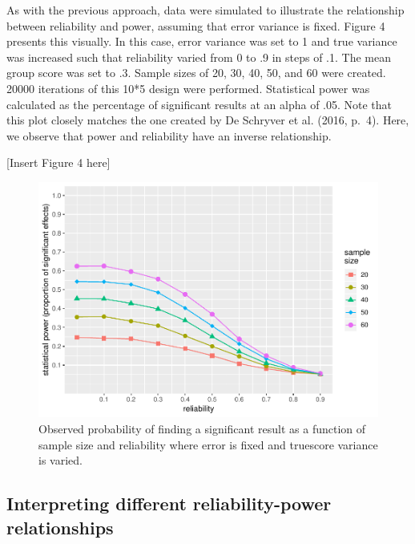 \documentclass[english,,man]{apa6}
\begin{document}
As with the previous approach, data were simulated to illustrate the relationship between reliability and power, assuming that error variance is fixed. Figure 4 presents this visually. In this case, error variance was set to 1 and true variance was increased such that reliability varied from 0 to .9 in steps of .1. The mean group score was set to .3. Sample sizes of 20, 30, 40, 50, and 60 were created. 20000 iterations of this 10*5 design were performed. Statistical power was calculated as the percentage of significant results at an alpha of .05. Note that this plot closely matches the one created by De Schryver et al. (2016, p.~4). Here, we observe that power and reliability have an inverse relationship.

\begin{center}
  
  [Insert Figure 4 here]
  
  \end{center}

\begin{figure}[H]
\includegraphics{visualising_reliability_and_power_relationships_v2_files/figure-latex/plotting4-1} \caption{Observed probability of finding a significant result as a function of sample size and reliability where error is fixed and truescore variance is varied.}\label{fig:plotting4}
\end{figure}

\hypertarget{interpreting-different-reliability-power-relationships}{%
\subsection{Interpreting different reliability-power relationships}\label{interpreting-different-reliability-power-relationships}}
\end{document}
